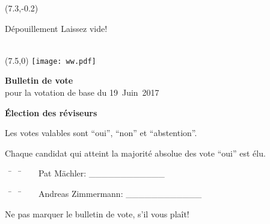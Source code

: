 \documentclass[11pt, a4paper]{scrartcl}
\begin{document}
{\begin{minipage}[t][12.5cm][t]{\textwidth}
\begin{textblock}{6}(7.3,-0.2)
\begin{framed}
Dépouillement \hfill Laissez vide! \\
\vspace{1.5cm} ~ \\
\end{framed}
\end{textblock}


\end{minipage}

\newpage

\begin{minipage}[t][12.5cm][t]{\textwidth}

\begin{textblock}{6}(7.5,0)
\texttt{[image: ww.pdf]}
\end{textblock}

{\LARGE\textbf{Bulletin de vote}} \\
pour la votation de base du 19~Juin~2017 \\

\vspace{2cm}


\textbf{Élection des réviseurs}

Les votes valables sont \enquote{oui}, \enquote{non} et \enquote{abstention}.

Chaque candidat qui atteint la majorité absolue des vote \enquote{oui} est élu.

\vspace{1cm}
\begin{tabbing}
~\hspace{2cm} \= ~\hspace{8cm} \= ~\hspace{2cm} \kill
~\> Pat Mächler:        \> \_\_\_\_\_\_\_\_\_\_\_\_ \\
\end{tabbing}

\vspace{0.1cm}
\begin{tabbing}
~\hspace{2cm} \= ~\hspace{8cm} \= ~\hspace{2cm} \kill
~\> Andreas Zimmermann: \> \_\_\_\_\_\_\_\_\_\_\_\_ \\
\end{tabbing}

\vspace{0.5cm}
Ne pas marquer le bulletin de vote, s'il vous plaît!

\end{minipage}


}
\end{document}
